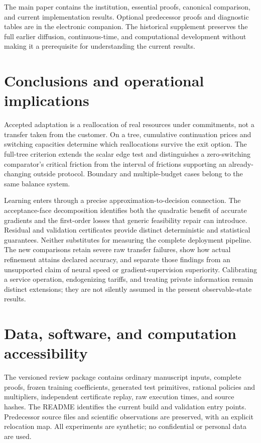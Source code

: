 \documentclass[11pt,letterpaper]{article}
\theoremstyle{definition}
\newcommand{\1}{\mathbf 1}
\begin{document}
The main paper contains the institution, essential proofs, canonical comparison, and current implementation results. Optional predecessor proofs and diagnostic tables are in the electronic companion. The historical supplement preserves the full earlier diffusion, continuous-time, and computational development without making it a prerequisite for understanding the current results.







\section{Conclusions and operational implications}
Accepted adaptation is a reallocation of real resources under commitments, not a transfer taken from the customer. On a tree, cumulative continuation prices and switching capacities determine which reallocations survive the exit option. The full-tree criterion extends the scalar edge test and distinguishes a zero-switching comparator's critical friction from the interval of frictions supporting an already-changing outside protocol. Boundary and multiple-budget cases belong to the same balance system.

Learning enters through a precise approximation-to-decision connection. The acceptance-face decomposition identifies both the quadratic benefit of accurate gradients and the first-order losses that generic feasibility repair can introduce. Residual and validation certificates provide distinct deterministic and statistical guarantees. Neither substitutes for measuring the complete deployment pipeline. The new comparisons retain severe raw transfer failures, show how actual refinement attains declared accuracy, and separate those findings from an unsupported claim of neural speed or gradient-supervision superiority. Calibrating a service operation, endogenizing tariffs, and treating private information remain distinct extensions; they are not silently assumed in the present observable-state results.
\appendix

\section*{Data, software, and computation accessibility}
The versioned review package contains ordinary manuscript inputs, complete proofs, frozen training coefficients, generated test primitives, rational policies and multipliers, independent certificate replay, raw execution times, and source hashes. The README identifies the current build and validation entry points. Predecessor source files and scientific observations are preserved, with an explicit relocation map. All experiments are synthetic; no confidential or personal data are used.
\clearpage
\end{document}
